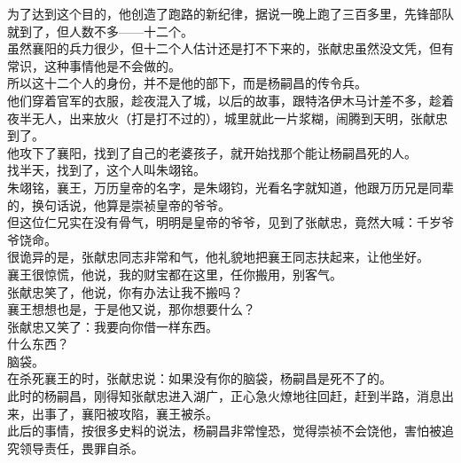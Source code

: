 \begin{multicols}{\theparacolNo}
为了达到这个目的，他创造了跑路的新纪律，据说一晚上跑了三百多里，先锋部队就到了，但人数不多——十二个。\\

虽然襄阳的兵力很少，但十二个人估计还是打不下来的，张献忠虽然没文凭，但有常识，这种事情他是不会做的。\\

所以这十二个人的身份，并不是他的部下，而是杨嗣昌的传令兵。\\

他们穿着官军的衣服，趁夜混入了城，以后的故事，跟特洛伊木马计差不多，趁着夜半无人，出来放火（打是打不过的），城里就此一片浆糊，闹腾到天明，张献忠到了。\\

他攻下了襄阳，找到了自己的老婆孩子，就开始找那个能让杨嗣昌死的人。\\

找半天，找到了，这个人叫朱翊铭。\\

朱翊铭，襄王，万历皇帝的名字，是朱翊钧，光看名字就知道，他跟万历兄是同辈的，换句话说，他算是崇祯皇帝的爷爷。\\

但这位仁兄实在没有骨气，明明是皇帝的爷爷，见到了张献忠，竟然大喊：千岁爷爷饶命。\\

很诡异的是，张献忠同志非常和气，他礼貌地把襄王同志扶起来，让他坐好。\\

襄王很惊慌，他说，我的财宝都在这里，任你搬用，别客气。\\

张献忠笑了，他说，你有办法让我不搬吗？\\

襄王想想也是，于是他又说，那你想要什么？\\

张献忠又笑了：我要向你借一样东西。\\

什么东西？\\

脑袋。\\

在杀死襄王的时，张献忠说：如果没有你的脑袋，杨嗣昌是死不了的。\\

此时的杨嗣昌，刚得知张献忠进入湖广，正心急火燎地往回赶，赶到半路，消息出来，出事了，襄阳被攻陷，襄王被杀。\\

此后的事情，按很多史料的说法，杨嗣昌非常惶恐，觉得崇祯不会饶他，害怕被追究领导责任，畏罪自杀。\\


\end{multicols}
